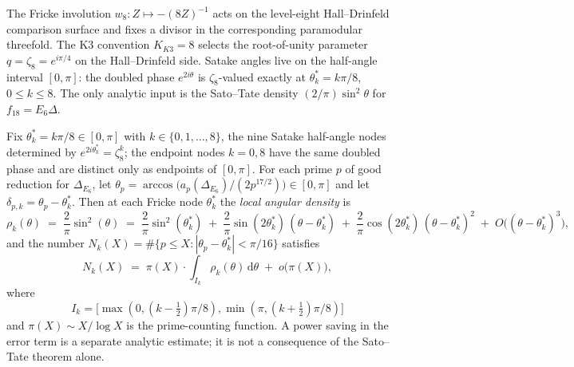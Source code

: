The Fricke involution $w_8: Z \mapsto -(8Z)^{-1}$ acts on the
level-eight Hall--Drinfeld comparison surface and fixes a divisor in
the corresponding paramodular threefold. The K3 convention
$K_{K3}=8$ selects the root-of-unity parameter
$q=\zeta_8=e^{i\pi/4}$ on the Hall--Drinfeld side. Satake angles
live on the half-angle interval $[0,\pi]$: the doubled phase
$e^{2i\theta}$ is $\zeta_8$-valued exactly at
$\theta_k^*=k\pi/8$, $0\le k\le8$.
The only analytic input is the Sato--Tate density
$(2/\pi)\sin^2\theta$ for $f_{18}=E_6\Delta$.

\begin{theorem}
\label{thm:stqp-fricke-z8-phase-leading}
%
%
%
Fix $\theta^*_k = k\pi/8 \in [0, \pi]$ with $k \in \{0, 1, \ldots,
8\}$, the nine Satake half-angle nodes determined by
$e^{2i\theta^*_k}=\zeta_8^k$; the endpoint nodes $k=0,8$ have the
same doubled phase and are distinct only as endpoints of $[0,\pi]$.
For each prime $p$ of good reduction for $\Delta_{E_6}$, let
$\theta_p = \arccos\bigl(a_p(\Delta_{E_6})/(2 p^{17/2})\bigr)
\in [0, \pi]$ and let $\delta_{p, k} = \theta_p - \theta^*_k$.
Then at each Fricke node $\theta^*_k$ the \emph{local angular
density} is
\begin{equation}
\label{eq:stqp-z8-leading}
 \rho_k(\theta)
 \;=\;
 \frac{2}{\pi}\sin^2(\theta)
 \;=\;
 \frac{2}{\pi}\sin^2(\theta^*_k)
 \;+\;
 \frac{2}{\pi}\sin(2\theta^*_k)\,(\theta - \theta^*_k)
 \;+\;
 \frac{2}{\pi}\cos(2\theta^*_k)\,(\theta - \theta^*_k)^2
 \;+\;
 O\bigl((\theta - \theta^*_k)^3\bigr),
\end{equation}
and the number
$N_k(X) = \#\{p \le X : |\theta_p - \theta^*_k|
< \pi/16\}$
satisfies
\begin{equation}
\label{eq:stqp-z8-count}
 N_k(X)
 \;=\;
 \pi(X)\cdot\int_{I_k}
 \rho_k(\theta)\,\mathrm d\theta
 \;+\;
 o\bigl(\pi(X)\bigr),
\end{equation}
where
\[
I_k=\bigl[\max(0,(k-\tfrac12)\pi/8),
\min(\pi,(k+\tfrac12)\pi/8)\bigr]
\]
and $\pi(X) \sim X/\log X$ is the prime-counting function. A power
saving in the error term is a separate analytic estimate; it is not
a consequence of the Sato--Tate theorem alone.
\end{theorem}

